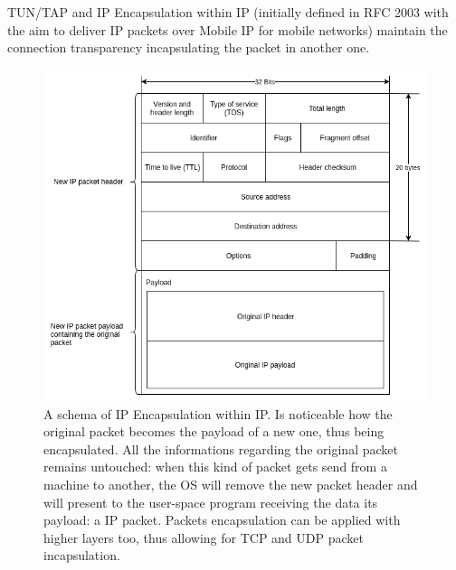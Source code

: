 \documentclass[10pt]{book}
\begin{document}
TUN/TAP and IP Encapsulation within IP (initially defined in RFC 2003 with the
aim to deliver IP packets over Mobile IP for mobile networks) maintain the
connection transparency incapsulating the packet in another one.
\begin{figure}[t]
  \centering \includegraphics[scale=0.5]{IPoverIP}
  \caption[IP Encapsulation within IP packet schema]{A schema of IP
    Encapsulation within IP. Is noticeable how the original packet becomes the
    payload of a new one, thus being encapsulated. All the informations
    regarding the original packet remains untouched: when this kind of packet
    gets send from a machine to another, the OS will remove the new packet
    header and will present to the user-space program receiving the data its
    payload: a IP packet. Packets encapsulation can be applied with higher
    layers too, thus allowing for TCP and UDP packet incapsulation.}
  \label{chap:prjan:img:ip_over_ip}
\end{figure}
\end{document}
